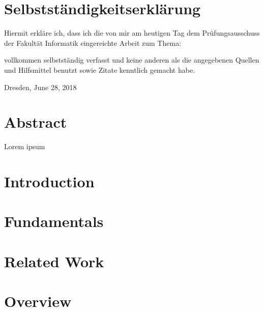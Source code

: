 \documentclass[
	paper=a4,
	fontsize=11pt,
	parskip=full %
]{scrreprt}
\begin{document}
	\chapter*{Selbstständigkeitserklärung}
	Hiermit erkläre ich, dass ich die von mir am heutigen Tag dem Prüfungsausschuss der Fakultät Informatik eingereichte Arbeit zum Thema:
	\begin{center}
		\textit{\thetitle} 
	\end{center}
	
	vollkommen selbstständig verfasst und keine anderen als die angegebenen Quellen und Hilfsmittel benutzt sowie Zitate kenntlich gemacht habe.
	
	Dresden, June 28, 2018 \\
	\theauthor
	
	
	\chapter*{Abstract}
    Lorem ipsum
	
	\tableofcontents
	
	
	\listoftables
	\vspace{-2.6\baselineskip}
	\begingroup
	\let\clearpage\relax
	\listoffigures
	\endgroup
	
	
	\chapter{Introduction}\label{ch:introduction}
    
    
    \chapter{Fundamentals}\label{ch:fundamentals}
    

    \chapter{Related Work}\label{ch:relatedwork}
    

    \chapter{Overview}\label{ch:overview}
    
\end{document}
